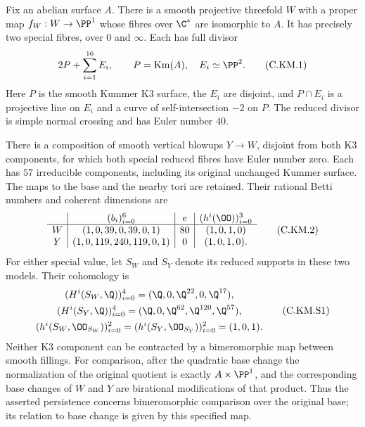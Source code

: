 
\begin{proposition}\label{cdp:st:C.2.UN.13}
Fix an abelian surface $A$. There is a smooth projective threefold
$W$ with a proper map $f_W:W\to\PP^1$ whose fibres over
$\C^*$ are isomorphic to $A$. It has precisely two special fibres,
over $0$ and $\infty$. Each has full divisor
\[
               2P+\sum_{i=1}^{16}E_i,\qquad
 P=\operatorname{Km}(A),\quad E_i\simeq\PP^2.       \tag{C.KM.1}\label{cdp:eq:C.KM.1}
\]
Here $P$ is the smooth Kummer K3 surface, the $E_i$ are disjoint,
and $P\cap E_i$ is a projective line on $E_i$ and a curve of
self-intersection $-2$ on $P$. The reduced divisor is simple
normal crossing and has Euler number $40$.

There is a composition of smooth vertical blowups $Y\to W$,
disjoint from both K3 components, for which both special reduced
fibres have Euler number zero. Each has $57$ irreducible
components, including its original unchanged Kummer surface.
The maps to the base and the nearby tori are retained. Their
rational Betti numbers and coherent dimensions are
\[
 \begin{array}{c|c|c|c}
 & (b_i)_{i=0}^6 & e & (h^i(\OO))_{i=0}^3\\ \hline
 W&(1,0,39,0,39,0,1)&80&(1,0,1,0)\\
 Y&(1,0,119,240,119,0,1)&0&(1,0,1,0).
 \end{array}                                             \tag{C.KM.2}\label{cdp:eq:C.KM.2}
\]
For either special value, let $S_W$ and $S_Y$ denote its
reduced supports in these two models. Their cohomology is
\[
 \begin{gathered}
 (H^i(S_W,\Q))_{i=0}^4=(\Q,0,\Q^{22},0,\Q^{17}),\\
 (H^i(S_Y,\Q))_{i=0}^4=(\Q,0,\Q^{62},\Q^{120},\Q^{57}),\\
 (h^i(S_W,\OO_{S_W}))_{i=0}^2
   =(h^i(S_Y,\OO_{S_Y}))_{i=0}^2=(1,0,1).
 \end{gathered}                                          \tag{C.KM.S1}\label{cdp:eq:C.KM.S1}
\]
Neither K3 component can be contracted by a bimeromorphic map
between smooth fillings. For comparison, after the quadratic
base change the normalization of the original quotient is
exactly $A\times\PP^1$, and the corresponding base changes
of $W$ and $Y$ are birational modifications of that product.
Thus the asserted persistence concerns bimeromorphic comparison
over the original base; its relation to base change is given
by this specified map.
\end{proposition}
